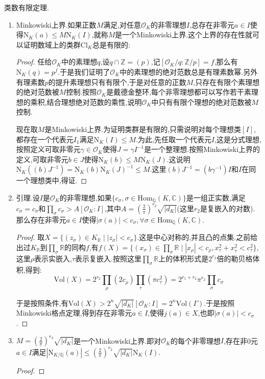 类数有限定理.
\begin{enumerate}
	\item Minkowiski上界.如果正数$M$满足,对任意$\mathscr{O}_K$的非零理想$I$,总存在非零元$a\in I$使得$\mathrm{N}_K(a)\le M\mathrm{N}_K(I)$,就称$M$是一个Minkowiski上界.这个上界的存在性就可以证明数域上的类群$\mathrm{Cl}_K$总是有限的:
	\begin{proof}
		
		任给$\mathscr{O}_K$中的素理想$q$,设$q\cap\mathbb{Z}=(p)$,记$[\mathscr{O}_K/q:\mathbb{Z}/p]=f$,那么有$\mathrm{N}_K(q)=p^f$.于是我们证明了$\mathscr{O}_K$中的素理想的绝对范数总是有理素数幂.另外有理素数$p$的提升素理想只有有限个,于是对任意的正数$M$,只存在有限个素理想的绝对范数被$M$控制.按照$\mathscr{O}_K$是戴德金整环,每个非零理想都可以写作若干素理想的乘积,结合理想绝对范数的乘性,说明$\mathscr{O}_K$中只有有限个理想的绝对范数被$M$控制.
		
		现在取$M$是Minkowiski上界.为证明类群是有限的,只需说明对每个理想类$[I]$,都存在一个代表元$I_1$满足$\mathrm{N}_K(I)\le M$.为此,先任取一个代表元$I$,这是分式理想,按照定义可取非零元$\gamma\in\mathscr{O}_K$使得$J=\gamma I^{-1}$是一个整理想.按照Minkowiski上界的定义,可取非零元$b\in J$使得$\mathrm{N}_K(b)\le M\mathrm{N}_K(J)$.这说明$\mathrm{N}_K((b)J^{-1})=\mathrm{N}_K(b)\mathrm{N}_K(J)^{-1}\le M$.这里$(b)J^{-1}=(b\gamma^{-1})I$和$I$在同一个理想类中,得证.
	\end{proof}
    \item 引理.设$I$是$\mathscr{O}_K$的非零理想,如果$\{c_{\sigma},\sigma\in\mathrm{Hom}_{\mathbb{Q}}(K,\mathbb{C})\}$是一组正实数,满足$c_{\sigma}=c_{\overline{\sigma}}$和$\prod_{\sigma}c_{\sigma}>A[\mathscr{O}_K:I]$,其中$A=\left(\frac{2}{\pi}\right)^{r_2}\sqrt{|d_K|}$(这里$r_2$是复嵌入的对数).那么存在非零元$a\in I$使得$|\sigma(a)|<c_{\sigma},\forall\sigma\in\mathrm{Hom}_{\mathbb{Q}}(K,\mathbb{C})$.
    \begin{proof}
    	
    	取$X=\{(z_{\sigma})\in K_{\mathbb{R}}\mid |z_{\sigma}|<c_{\sigma}\}$.这是中心对称的,并且凸的点集.之前给出过$K_{\mathbb{R}}$到$\prod_{\sigma}\mathbb{R}$的同构$f$,有$f(X)=\{(x_{\sigma})\in\prod_{\sigma}\mathbb{R}\mid |x_{\rho}|<c_{\rho},x_{\tau}^2+x_{\overline{\tau}}^2<c_{\tau}^2\}$,这里$\rho$表示实嵌入,$\tau$表示复嵌入.按照这里$\prod_{\sigma}\mathbb{R}$上的体积形式是$2^{r_2}$倍的勒贝格体积,得到:
    	$$\mathrm{Vol}(X)=2^{r_2}\prod_{\rho}(2c_{\rho})\prod_{\tau}(\pi c_{\tau}^2)=2^{r_1+r_2}\pi^{r_2}\prod_{\sigma}c_{\sigma}$$
    	
    	于是按照条件,有$\mathrm{Vol}(X)>2^n\sqrt{|d_K|}[\mathscr{O}_K:I]=2^n\mathrm{Vol}(\Gamma)$.于是按照Minkowiski格点定理,得到存在非零元$a\in I$,使得$j(a)\in X$,也即$|\sigma(a)|<c_{\sigma}$.
    \end{proof}
	\item $M=\left(\frac{2}{\pi}\right)^{r_2}\sqrt{|d_K|}$是一个Minkowiski上界.即对$\mathscr{O}_K$的每个非零理想$I$,存在非0元$a\in I$满足$|\mathrm{N}_{K/\mathbb{Q}}(a)|\le\left(\frac{2}{\pi}\right)^{r_2}\sqrt{|d_K|}\mathrm{N}_K(I)$.
	\begin{proof}
		

\end{proof}
\end{enumerate}

